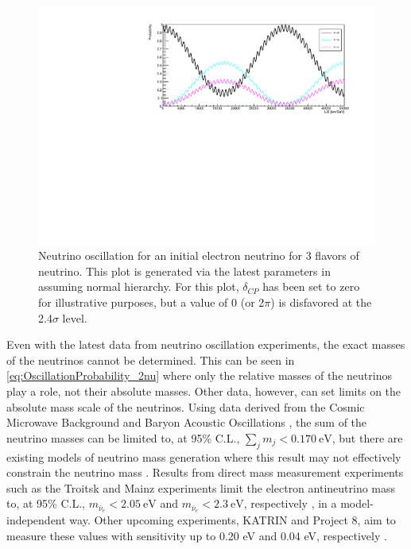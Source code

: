 \begin{figure}[tbph]
\centering
\includegraphics[width=0.95\linewidth]{Figures/Oscillation_2017Params_0CP.pdf}
\caption[Neutrino oscillation for an initial electron neutrino for 3 flavors of neutrino.]
{Neutrino oscillation for an initial electron neutrino for 3 flavors of neutrino.
This plot is generated via the latest parameters in \cite{Patrignani:2016xqp} assuming normal hierarchy. 
For this plot, $\delta_{CP}$ has been set to zero for illustrative purposes, but a value of 0 (or 2$\pi$) is disfavored at the 2.4$\sigma$ level.}
\label{fig:Oscillations_electron_long}
\end{figure}

Even with the latest data from neutrino oscillation experiments, the exact masses of the neutrinos cannot be determined.
This can be seen in \autoref{eq:OscillationProbability_2nu} where only the relative masses of the neutrinos play a role, not their absolute masses. 
Other data, however, can set limits on the absolute mass scale of the neutrinos.
Using data derived from the Cosmic Microwave Background and Baryon Acoustic Oscillations \cite{refId0}, the sum of the neutrino masses can be limited to, at 95\% C.L., $\sum_j m_j < 0.170~\textrm{eV}$, but there are existing models of neutrino mass generation where this result may not effectively constrain the neutrino mass \cite{Koksbang:2017rux} \cite{PhysRevLett.94.111801}.
Results from direct mass measurement experiments such as the Troitsk and Mainz experiments limit the electron antineutrino mass to, at 95\% C.L., $m_{\bar{\nu}_e} < 2.05~\textrm{eV}$ and $m_{\bar{\nu}_e} < 2.3~\textrm{eV}$, respectively \cite{Aseev:2011dq} \cite{Kraus:2004zw}, in a model-independent way.
Other upcoming experiments, KATRIN and Project 8, aim to measure these values with sensitivity up to 0.20 eV  and 0.04 eV, respectively \cite{Robertson:2013ziv} \cite{Esfahani:2017dmu}.

